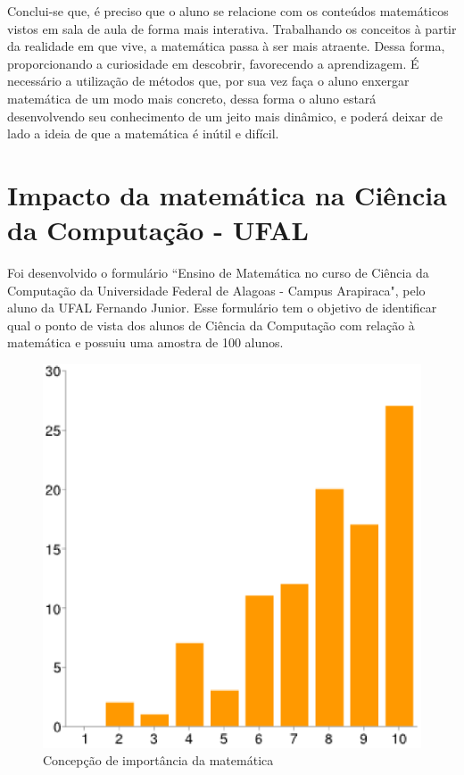\documentclass[12pt,a4paper]{article}
\begin{document}
Conclui-se que, é preciso que o aluno se relacione com os conteúdos matemáticos vistos em sala de aula de forma mais interativa. Trabalhando os conceitos à partir da realidade em que vive, a matemática passa à ser mais atraente. Dessa forma, proporcionando a curiosidade em descobrir, favorecendo a aprendizagem. É necessário a utilização de métodos que, por sua vez faça o aluno enxergar matemática de um modo mais concreto, dessa forma o aluno estará desenvolvendo seu conhecimento de um jeito mais dinâmico, e poderá deixar de lado a ideia de que a matemática é inútil e difícil.

\section{Impacto da matemática na Ciência da Computação - UFAL}

Foi desenvolvido o formulário ``Ensino de Matemática no curso de Ciência da Computação da Universidade Federal de Alagoas - Campus Arapiraca", pelo aluno da UFAL Fernando Junior. Esse formulário tem o objetivo de identificar qual o ponto de vista dos alunos de Ciência da Computação com relação à matemática e possuiu uma amostra de 100 alunos. 

\begin{figure}[htb]
	\centering
	\includegraphics[scale=0.4]{imagens/1.eps} 
	\caption{Concepção de importância da matemática}
	\label{fig:grafImportanciaMat}
\end{figure}
\end{document}
